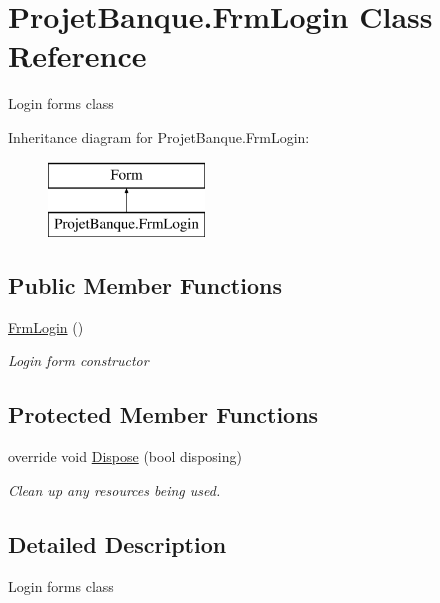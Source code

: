 \hypertarget{class_projet_banque_1_1_frm_login}{}\section{Projet\+Banque.\+Frm\+Login Class Reference}
\label{class_projet_banque_1_1_frm_login}


Login form\textquotesingle{}s class  


Inheritance diagram for Projet\+Banque.\+Frm\+Login\+:\begin{figure}[H]
\begin{center}
\leavevmode
\includegraphics[height=2.000000cm]{class_projet_banque_1_1_frm_login}
\end{center}
\end{figure}
\subsection*{Public Member Functions}
\begin{DoxyCompactItemize}
\item 
\mbox{\hyperlink{class_projet_banque_1_1_frm_login_a7b5b2a53d0d6a32dbf81520c356645b4}{Frm\+Login}} ()
\begin{DoxyCompactList}\small\item\em Login form constructor \end{DoxyCompactList}\end{DoxyCompactItemize}
\subsection*{Protected Member Functions}
\begin{DoxyCompactItemize}
\item 
override void \mbox{\hyperlink{class_projet_banque_1_1_frm_login_a95d917ac105856fc6a14e061f25711df}{Dispose}} (bool disposing)
\begin{DoxyCompactList}\small\item\em Clean up any resources being used. \end{DoxyCompactList}\end{DoxyCompactItemize}


\subsection{Detailed Description}
Login form\textquotesingle{}s class 



